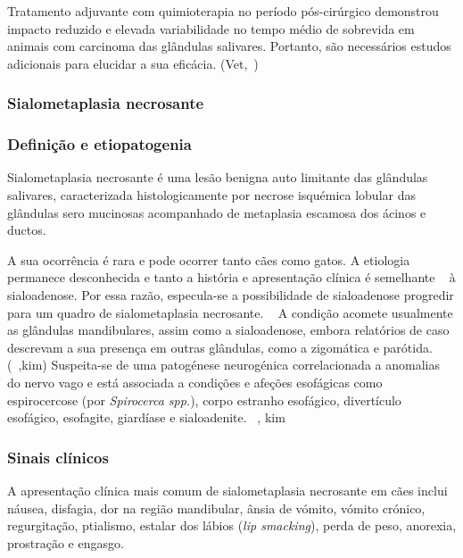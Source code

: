 Tratamento adjuvante com quimioterapia no período pós-cirúrgico demonstrou impacto reduzido e elevada variabilidade no tempo médio de sobrevida em animais com carcinoma das glândulas salivares. Portanto, são necessários estudos adicionais para elucidar a sua eficácia. (Vet,~\cite{Hammer2001})

\subsubsection{Sialometaplasia necrosante}
\subsubsection{Definição e etiopatogenia}


Sialometaplasia necrosante é uma lesão benigna auto limitante das glândulas salivares, caracterizada histologicamente	por necrose isquémica lobular das glândulas sero mucinosas acompanhado de metaplasia escamosa dos ácinos e ductos. ~\cite{Mukaratirwa2015,reiter_bsava_2018} 


A sua ocorrência é rara e pode ocorrer tanto cães como gatos. A etiologia permanece desconhecida e tanto a história e apresentação clínica é semelhante ~\cite{Han2016} à sialoadenose. Por essa razão, especula-se a possibilidade de sialoadenose progredir para um quadro de sialometaplasia necrosante. ~\cite{reiter_bsava_2018} A condição acomete usualmente as glândulas mandibulares, assim como a sialoadenose, embora relatórios de caso descrevam a sua presença em outras glândulas, como a zigomática e parótida. (~\cite{perez-ecija_granulomatous_2012},kim) Suspeita-se de uma patogénese neurogénica correlacionada a anomalias do nervo vago  e está associada a condições e afeções esofágicas como espirocercose (por \textit{Spirocerca spp.}), corpo estranho esofágico, divertículo esofágico, esofagite, giardíase e sialoadenite. ~\cite{reiter_bsava_2018,schoroeder}, kim


\subsubsection{Sinais clínicos}


A apresentação clínica mais comum de sialometaplasia necrosante em cães inclui náusea, disfagia, dor na região mandibular, ânsia de vómito, vómito crónico, regurgitação, ptialismo, estalar dos lábios (\textit{lip smacking}), perda de peso, anorexia, prostração e engasgo. ~\cite{Mukaratirwa2015,reiter_bsava_2018} 


